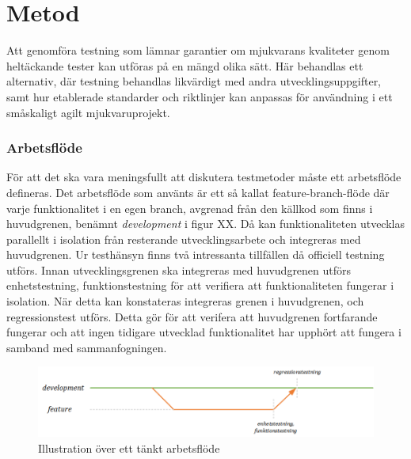 
\chapter{Metod}
\label{cha:method}
Att genomföra testning som lämnar garantier om mjukvarans kvaliteter genom heltäckande tester kan utföras på en mängd olika sätt. Här behandlas ett alternativ, där testning behandlas likvärdigt med andra utvecklingsuppgifter, samt hur etablerade standarder och riktlinjer kan anpassas för användning i ett småskaligt agilt mjukvaruprojekt.

\subsection{Arbetsflöde}
För att det ska vara meningsfullt att diskutera testmetoder måste ett arbetsflöde defineras. Det arbetsflöde som använts är ett så kallat feature-branch-flöde där varje funktionalitet i en egen branch, avgrenad från den källkod som finns i huvudgrenen, benämnt \textit{development} i figur XX. Då kan funktionaliteten utvecklas parallellt i isolation från resterande utvecklingsarbete och integreras med huvudgrenen. Ur testhänsyn finns två intressanta tillfällen då officiell testning utförs. Innan utvecklingsgrenen ska integreras med huvudgrenen utförs enhetstestning, funktionstestning för att verifiera att funktionaliteten fungerar i isolation. När detta kan konstateras integreras grenen i huvudgrenen, och regressionstest utförs. Detta gör för att verifera att huvudgrenen fortfarande fungerar och att ingen tidigare utvecklad funktionalitet har upphört att fungera i samband med sammanfogningen.

\begin{figure}[h]
  \centering
  \includegraphics[scale=1]{git_workflow}
  \caption{Illustration över ett tänkt arbetsflöde}
  \label{fig:git_workflow}
\end{figure}
